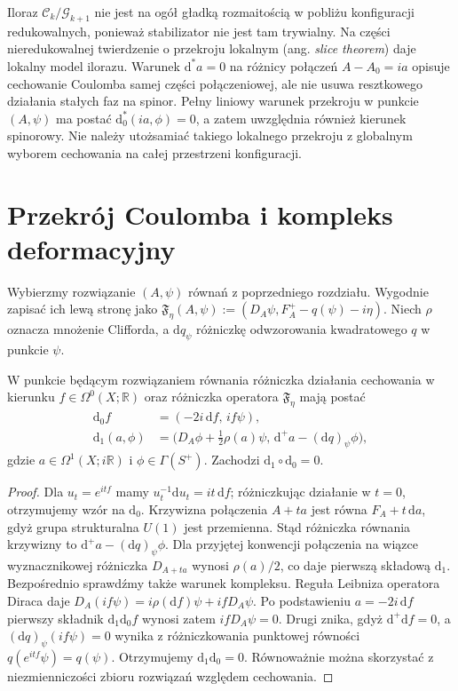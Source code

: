 \begin{uwaga}
Iloraz $\mathcal C_k/\mathcal G_{k+1}$ nie jest na ogół gładką
rozmaitością w pobliżu konfiguracji redukowalnych, ponieważ
stabilizator nie jest tam trywialny. Na części nieredukowalnej
twierdzenie o przekroju lokalnym (ang. \emph{slice theorem})
daje lokalny model ilorazu. Warunek $\mathrm d^*a=0$
na różnicy połączeń $A-A_0=ia$ opisuje cechowanie Coulomba
samej części połączeniowej, ale nie usuwa resztkowego działania
stałych faz na spinor. Pełny liniowy warunek przekroju
w punkcie $(A,\psi)$ ma postać $\mathrm d_0^*(ia,\phi)=0$,
a zatem uwzględnia również kierunek spinorowy.
Nie należy utożsamiać takiego lokalnego przekroju
z globalnym wyborem cechowania na całej przestrzeni konfiguracji.
\end{uwaga}

\section{Przekrój Coulomba i kompleks deformacyjny}
\label{sec:tg-sw-deform}

Wybierzmy rozwiązanie $(A,\psi)$ równań z poprzedniego
rozdziału. Wygodnie zapisać ich lewą stronę jako
$\mathfrak F_\eta(A,\psi):=(D_A\psi,F_A^+-q(\psi)-i\eta)$.
Niech $\rho$ oznacza mnożenie Clifforda, a
$\mathrm dq_\psi$ różniczkę odwzorowania kwadratowego $q$
w punkcie $\psi$.

\begin{stwierdzenie}
\label{prop:tg-sw-linear}
W punkcie będącym rozwiązaniem równania różniczka działania
cechowania w kierunku $f\in\Omega^0(X;\mathbb R)$ oraz
różniczka operatora $\mathfrak F_\eta$ mają postać
\[
\begin{aligned}
\mathrm d_0f&=(-2i\,\mathrm df,\,if\psi),\\
\mathrm d_1(a,\phi)&=\bigl(D_A\phi+\tfrac12\rho(a)\psi,\,
\mathrm d^+a-(\mathrm dq)_\psi\phi\bigr),
\end{aligned}
\]
gdzie $a\in\Omega^1(X;i\mathbb R)$ i $\phi\in\Gamma(S^+)$.
Zachodzi $\mathrm d_1\circ\mathrm d_0=0$.
\end{stwierdzenie}

\begin{proof}
Dla $u_t=e^{itf}$ mamy
$u_t^{-1}\mathrm du_t=it\,\mathrm df$; różniczkując działanie
w $t=0$, otrzymujemy wzór na $\mathrm d_0$.
Krzywizna połączenia $A+ta$ jest równa
$F_A+t\,\mathrm da$, gdyż grupa strukturalna $U(1)$
jest przemienna. Stąd różniczka równania krzywizny
to $\mathrm d^+a-(\mathrm dq)_\psi\phi$.
Dla przyjętej konwencji połączenia na wiązce wyznacznikowej
różniczka $D_{A+ta}$ wynosi $\rho(a)/2$, co daje
pierwszą składową $\mathrm d_1$.
Bezpośrednio sprawdźmy także warunek kompleksu.
Reguła Leibniza operatora Diraca daje
$D_A(if\psi)=i\rho(\mathrm df)\psi+ifD_A\psi$.
Po podstawieniu $a=-2i\,\mathrm df$ pierwszy
składnik $\mathrm d_1\mathrm d_0f$ wynosi zatem
$ifD_A\psi=0$. Drugi znika, gdyż
$\mathrm d^+\mathrm df=0$, a
$(\mathrm dq)_\psi(if\psi)=0$ wynika
z różniczkowania punktowej równości
$q(e^{itf}\psi)=q(\psi)$.
Otrzymujemy $\mathrm d_1\mathrm d_0=0$.
Równoważnie można skorzystać z niezmienniczości
zbioru rozwiązań względem cechowania.
\end{proof}

